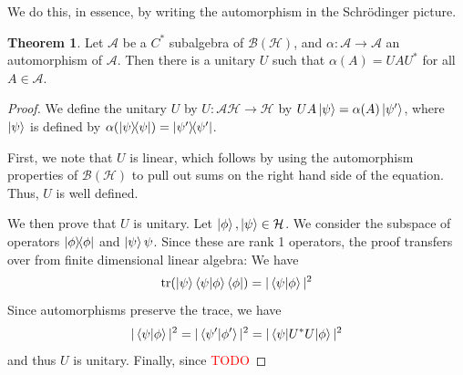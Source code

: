 \documentclass[prb,12pt, nofootinbib]{revtex4-2}
\theoremstyle{definition}
\newtheorem{Theorem}{Theorem}
\theoremstyle{definition}
\theoremstyle{definition}
\theoremstyle{definition}
\begin{document}
We do this, in essence, by writing the automorphism in the Schrödinger picture.
\begin{Theorem}
	Let $\mathcal{A}$ be a $C^*$ subalgebra of $\mathcal{B}(\mathcal{H})$, and $\alpha:\mathcal{A}\to\mathcal{A}$ an automorphism of $\mathcal{A}$. Then there is a unitary $U$ such that $\alpha(A)=UAU^*$ for all $A\in \mathcal{A}$.
\end{Theorem}
\begin{proof}
	We define the unitary $U$ by $U:\mathcal{A}\mathcal{H}\to\mathcal{H}$ by $UA\ket{\psi}=\alpha(A)\ket{\psi'}$, where $\ket{\psi}$ is defined by $\alpha(\dyad{\psi}{\psi})=\dyad{\psi'}{\psi'}$.
	
	First, we note that $U$ is linear, which follows by using the automorphism properties of $\mathcal{B}(\mathcal{H})$ to pull out sums on the right hand side of the equation. Thus, $U$ is well defined.
	
	We then prove that $U$ is unitary. Let $\ket{\phi},\ket{\psi}\in \mathcal{H}$. We consider the subspace of operators $\dyad{\phi}{\phi}$ and $\ket{\psi}{\psi}$. Since these are rank 1 operators, the proof transfers over from finite dimensional linear algebra: We have
	\[\tr(\ket{\psi}\braket{\psi}{\phi}\bra{\phi})=|\braket{\psi}{\phi}|^2\]
	Since automorphisms preserve the trace, we have
	\[|\braket{\psi}{\phi}|^2 = |\braket{\psi'}{\phi'}|^2 = |\mel{\psi}{U^*U}{\phi}|^2\]
	and thus $U$ is unitary. Finally, since \textcolor{red}{TODO}
\end{proof}
\end{document}
